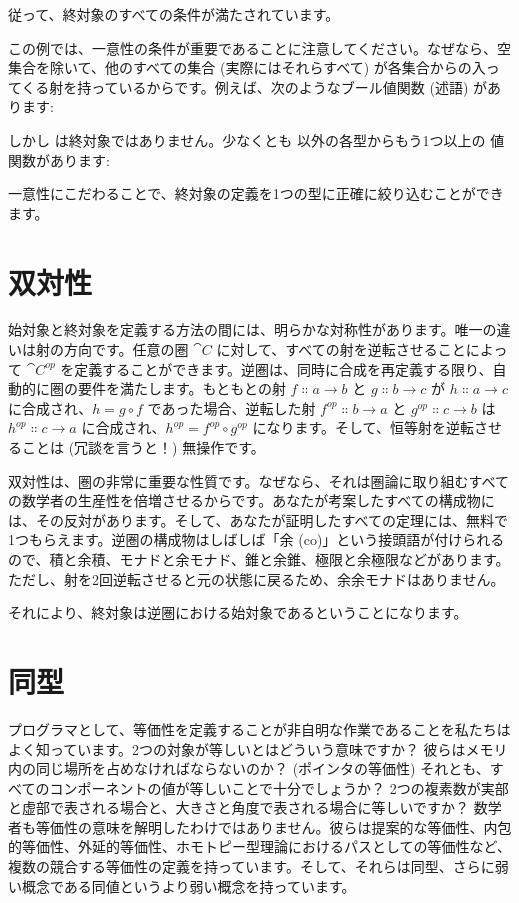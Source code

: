 従って、終対象のすべての条件が満たされています。

この例では、一意性の条件が重要であることに注意してください。なぜなら、空集合を除いて、他のすべての集合 (実際にはそれらすべて) が各集合からの入ってくる射を持っているからです。例えば、次のようなブール値関数 (述語) があります:

しかし  は終対象ではありません。少なくとも  以外の各型からもう1つ以上の  値関数があります:

一意性にこだわることで、終対象の定義を1つの型に正確に絞り込むことができます。

\section{双対性}

始対象と終対象を定義する方法の間には、明らかな対称性があります。唯一の違いは射の方向です。任意の圏 $\cat{C}$ に対して、すべての射を逆転させることによって $\cat{C}^\mathit{op}$ を定義することができます。逆圏は、同時に合成を再定義する限り、自動的に圏の要件を満たします。もともとの射 $f \Colon a \to b$ と $g \Colon b \to c$ が $h \Colon a \to c$ に合成され、$h = g \circ f$ であった場合、逆転した射 $f^\mathit{op} \Colon b \to a$ と $g^\mathit{op} \Colon c \to b$ は $h^\mathit{op} \Colon c \to a$ に合成され、$h^\mathit{op} = f^\mathit{op} \circ g^\mathit{op}$ になります。そして、恒等射を逆転させることは (冗談を言うと！) 無操作です。

双対性は、圏の非常に重要な性質です。なぜなら、それは圏論に取り組むすべての数学者の生産性を倍増させるからです。あなたが考案したすべての構成物には、その反対があります。そして、あなたが証明したすべての定理には、無料で1つもらえます。逆圏の構成物はしばしば「余 (co)」という接頭語が付けられるので、積と余積、モナドと余モナド、錐と余錐、極限と余極限などがあります。ただし、射を2回逆転させると元の状態に戻るため、余余モナドはありません。

それにより、終対象は逆圏における始対象であるということになります。

\section{同型}

プログラマとして、等価性を定義することが非自明な作業であることを私たちはよく知っています。2つの対象が等しいとはどういう意味ですか？ 彼らはメモリ内の同じ場所を占めなければならないのか？ (ポインタの等価性) それとも、すべてのコンポーネントの値が等しいことで十分でしょうか？ 2つの複素数が実部と虚部で表される場合と、大きさと角度で表される場合に等しいですか？ 数学者も等価性の意味を解明したわけではありません。彼らは提案的な等価性、内包的等価性、外延的等価性、ホモトピー型理論におけるパスとしての等価性など、複数の競合する等価性の定義を持っています。そして、それらは同型、さらに弱い概念である同値というより弱い概念を持っています。

